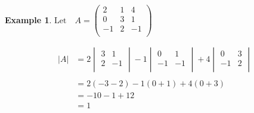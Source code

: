 \documentclass[11pt,a4paper]{article}
\theoremstyle{definition}
\newtheorem{example}[thm]{Example}
\begin{document}
\begin{example}

$\text{Let}\quad  A=
\begin{pmatrix}
2 & 1 & 4\\
0 & 3 & 1\\
-1 & 2 & -1\\
\end{pmatrix}
$

\begin{align*}
|A| &= 2
\begin{vmatrix}
3 & 1\\
2 & -1\\
\end{vmatrix}
-1
\begin{vmatrix}
0 & 1\\
-1 & -1\\
\end{vmatrix} 
+ 4
\begin{vmatrix}
0 & 3\\
-1 & 2\\
\end{vmatrix}\\\\
& = 2 (-3-2)-1(0+1)+4(0+3)\\
& = -10 -1 +12\\
& = 1\\
\end{align*}



\end{example}
\end{document}
